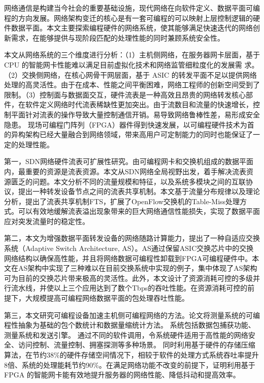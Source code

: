 
\label{chap6}

\label{chap61}

网络通信是构建当今社会的重要基础设施，现代网络在向软件定义、数据平面可编程的方向发展。网络架构变迁的核心是有一套可编程的可以映射上层控制逻辑的硬件数据平面。本文主要探索编程硬件的网络系统，使其能够满足快速迭代的网络创新需求，在能够提供与现阶段匹配的处理性能的同时兼顾系统安全性。

本文从网络系统的三个维度进行分析：（1）主机侧网络，在服务器网卡层面，基于 CPU 的智能网卡性能难以满足目前虚拟化技术和网络监管细粒度化的发展需
求。（2）交换侧网络，在核心网骨干网层面，基于 ASIC 的转发平面不足以提供网络处理的高灵活性。由于在成本、性能之间平衡困难，网络工程师的创新空间受到了限制。（3）控制面与数据面交互，硬件流表是一种高效且昂贵的网络转发核心部件，在软件定义网络时代流表稀缺性更加突出。由于流数目和流量的快速增长，控制平面针对流表的操作导致大量控制通信开销。易导致网络鲁棒性差，易形成安全隐患。
现场可编程门阵列（FPGA）器件得到快速发展，以可编程硬件技术为首的异构架构已经大量融合到网络领域，带来高用户可定制能力的同时也能保证了一定的处理性能。

第一，SDN网络硬件流表可扩展性研究。由可编程网卡和交换机组成的数据平面内，最重要的资源是流表资源。本文从SDN网络全局视野出发，着手解决流表资源匮乏的问题。本文分析不同的流量规模和特征，以及系统多模块之间的互联协议，提出一种转发设备节点之间的流表共享机制。本文基于流量分布规律以及理论分析，提出了流表共享机制FTS，扩展了OpenFlow交换机的Table-Miss处理方式。可以有效地缓解流表溢出现象带来的巨大网络通信性能损失，实现了数据平面应对突发流量时的稳定性。


第二，本文为增强数据平面转发设备的网络随路计算能力，提出了一种自适应交换系统（Adaptive Switch Architecture, AS）。AS通过保留ASIC交换芯片中的交换网络结构以确保高性能，并且将网络数据可编程性卸载到FPGA可编程硬件中。本文在AS架构中实现了三种难以在目前交换系统中实现的例子，集中体现了AS架构可为目前的交换芯片带来极高的灵活性。此外，本文设计了资源消耗可控的多级并行流水线，并使以上三个应用达到了数个Tbps的吞吐性能。在资源消耗可控的前提下，大规模提高可编程网络数据平面的包处理吞吐性能。

第三，本文研究可编程设备加速主机侧可编程网络的方法。论文将测量系统的可编程性抽象为基础的包个数统计和数据量缩统计方法。
系统包括数据包捕获功能、测量系统和发送引擎。
通过不同的软件调用，令系统硬件适用于高性能的网络安全、访问控制、流量控制、拥塞探测等多种场景。
同时利用基于硬件的存储压缩算法，在节约38\%的硬件存储空间情况下，相较于软件的处理方式系统吞吐率提升8倍、系统的处理能耗节约90\%。在满足网络功能不改变的前提下，证明利用基于 FPGA 的智能网卡能有效地提升服务器的网络性能、降低抖动和提高效率。



